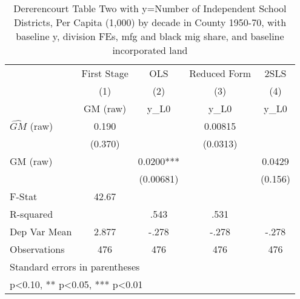 \begin{table}[htbp]\centering
\def\sym#1{\ifmmode^{#1}\else\(^{#1}\)\fi}
\caption{Dererencourt Table Two with y=Number of Independent School Districts, Per Capita (1,000) by decade in County 1950-70, with baseline y, division FEs, mfg and black mig share, and baseline incorporated land}
\begin{tabular}{l*{4}{c}}
\toprule
                    & First Stage   &         OLS   &Reduced Form   &        2SLS   \\
                    &\multicolumn{1}{c}{(1)}&\multicolumn{1}{c}{(2)}&\multicolumn{1}{c}{(3)}&\multicolumn{1}{c}{(4)}\\
                    &\multicolumn{1}{c}{GM  (raw)}&\multicolumn{1}{c}{y\_L0}&\multicolumn{1}{c}{y\_L0}&\multicolumn{1}{c}{y\_L0}\\
\midrule
$\hat{GM}$ (raw)    &       0.190   &               &     0.00815   &               \\
                    &     (0.370)   &               &    (0.0313)   &               \\
\addlinespace
GM  (raw)           &               &      0.0200***&               &      0.0429   \\
                    &               &   (0.00681)   &               &     (0.156)   \\
\midrule
F-Stat              &       42.67   &               &               &               \\
R-squared           &               &        .543   &        .531   &               \\
Dep Var Mean        &       2.877   &       -.278   &       -.278   &       -.278   \\
Observations        &         476   &         476   &         476   &         476   \\
\bottomrule
\multicolumn{5}{l}{\footnotesize Standard errors in parentheses}\\
\multicolumn{5}{l}{\footnotesize * p<0.10, ** p<0.05, *** p<0.01}\\
\end{tabular}
\end{table}
